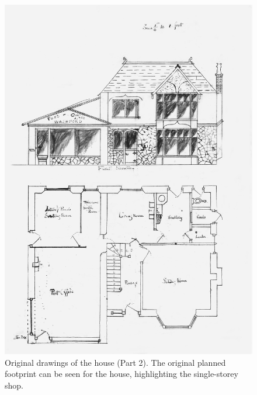 \begin{figure}[p]
     \includegraphics[width=1\textwidth]{figures/HillHeadHousePlans2}
     \caption{Original drawings of the house (Part 2). The original planned footprint can be seen for the house, highlighting the single-storey shop.}
     \label{fig:HousePlans2}
\end{figure}

\afterpage{\clearpage}

